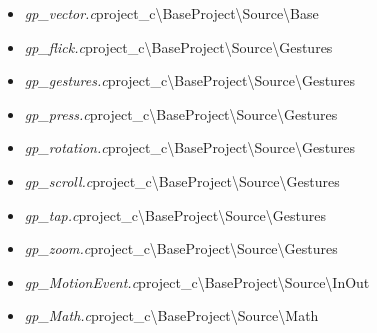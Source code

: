 \begin{itemize}
\item \textit{gp_vector.c}\quad project_c\textbackslash BaseProject\textbackslash Source\textbackslash Base
\item \textit{gp_flick.c}\quad project_c\textbackslash BaseProject\textbackslash Source\textbackslash Gestures
\item \textit{gp_gestures.c}\quad project_c\textbackslash BaseProject\textbackslash Source\textbackslash Gestures
\item \textit{gp_press.c}\quad project_c\textbackslash BaseProject\textbackslash Source\textbackslash Gestures
\item \textit{gp_rotation.c}\quad project_c\textbackslash BaseProject\textbackslash Source\textbackslash Gestures
\item \textit{gp_scroll.c}\quad project_c\textbackslash BaseProject\textbackslash Source\textbackslash Gestures
\item \textit{gp_tap.c}\quad project_c\textbackslash BaseProject\textbackslash Source\textbackslash Gestures
\item \textit{gp_zoom.c}\quad project_c\textbackslash BaseProject\textbackslash Source\textbackslash Gestures
\item \textit{gp_MotionEvent.c}\quad project_c\textbackslash BaseProject\textbackslash Source\textbackslash InOut
\item \textit{gp_Math.c}\quad project_c\textbackslash BaseProject\textbackslash Source\textbackslash Math
\end{itemize}
